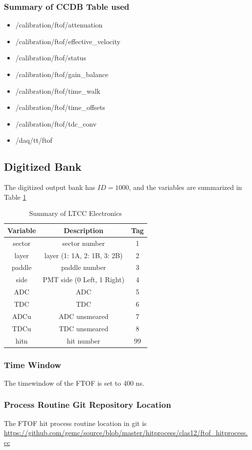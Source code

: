 \subsubsection{Summary of CCDB Table used}
\begin{itemize}
	\item /calibration/ftof/attenuation
	\item /calibration/ftof/effective\_velocity
	\item /calibration/ftof/status
	\item /calibration/ftof/gain\_balance
	\item /calibration/ftof/time\_walk
	\item /calibration/ftof/time\_offsets
	\item /calibration/ftof/tdc\_conv
	\item /daq/tt/ftof
\end{itemize}

\subsection{Digitized Bank}
The digitized output bank has $ID=1000$, and the variables are summarized in Table \ref{tab:ftofBank}

\begin{table}[h]
	\begin{center}
		\begin{tabular}{| c | c | c |}
			\hline \hline
			Variable         & Description  & Tag  \\
			\hline
              sector  &                             sector number  &    1 \\
               layer  &               layer (1: 1A, 2: 1B, 3: 2B)  &    2 \\
              paddle  &                             paddle number  &    3 \\
                side  &                PMT side (0 Left, 1 Right)  &    4 \\
                 ADC  &                                       ADC  &    5 \\
                 TDC  &                                       TDC  &    6 \\
                ADCu  &                             ADC unsmeared  &    7 \\
                TDCu  &                             TDC unsmeared  &    8 \\
                hitn  &                                hit number  &   99 \\
			\hline \hline
		\end{tabular}
	\end{center}
	\caption{Summary of LTCC Electronics}\label{tab:ftofBank}
\end{table}


\subsubsection{Time Window}

The timewindow of the FTOF is set to 400 ns.

\subsubsection{Process Routine Git Repository Location}
The FTOF hit process routine location in git is \url{https://github.com/gemc/source/blob/master/hitprocess/clas12/ftof_hitprocess.cc}


